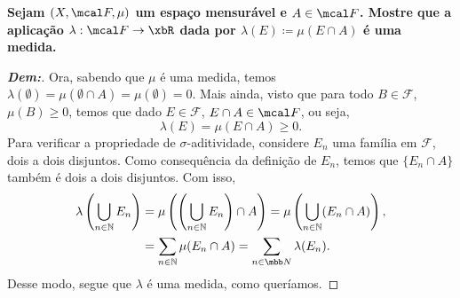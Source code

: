 \myexe{\thedois}
\bigline
\textbf{Sejam $(X, \mcal F, \mu)$ um espaço mensurável e $A \in \mcal F$. 
Mostre que a aplicação $\lambda: \mcal F \rightarrow \xbR$ dada por 
$\lambda(E)\coloneq \mu(E \cap A)$ é uma medida.}
\begin{proof}[\textbf{Dem:}]
Ora, sabendo que $\mu$ é uma medida, temos 
$\lambda(\emptyset) = \mu(\emptyset \cap A) = \mu(\emptyset) = 0$. Mais ainda, 
visto que para todo $B \in \mathcal F$, $\mu(B) \ge 0$, temos que dado $E \in \mathcal F$,
$E \cap A \in \mcal F$, ou seja, 
$$\lambda(E) = \mu(E \cap A) \ge 0.$$ 
Para verificar a propriedade de $\sigma$-aditividade, considere ${E_n}$ uma família em 
$\mathcal F$, dois a dois disjuntos. Como consequência da definição de ${E_n}$, temos que 
$\{E_n \cap A\}$ também é dois a dois disjuntos. Com isso,
\begin{align*}
   \lambda\left(\bigcup\limits_{n \in \mathbb N} E_n\right) &= 
   \mu\left(\left(\bigcup\limits_{n \in \mathbb N} E_n\right)\cap A\right) = 
   \mu\left(\bigcup\limits_{n \in \mathbb N} (E_n \cap A)\right),\\
   &=\sum_{n \in \mathbb N}\mu(E_n \cap A)=\sum_{n\in\mbb N}\lambda(E_n).
\end{align*}
Desse modo, segue que $\lambda$ é uma medida, como queríamos.
\end{proof}
\biglinend

